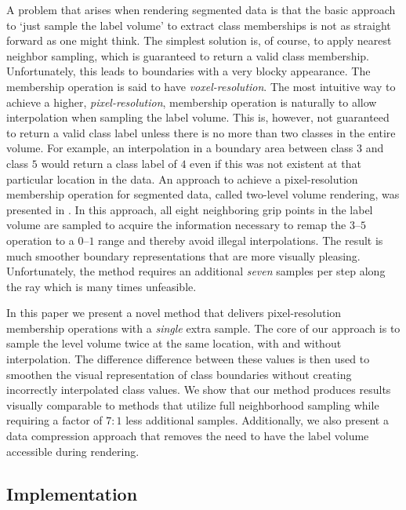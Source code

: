 \documentclass{egpubl}
\begin{document}
A problem that arises when rendering segmented data is that the basic approach to `just sample the label volume' to extract class memberships is not as straight forward as one might think. The simplest solution is, of course, to apply nearest neighbor sampling, which is guaranteed to return a valid class membership. Unfortunately, this leads to boundaries with a very blocky appearance. The membership operation is said to have \emph{voxel-resolution}. The most intuitive way to achieve a higher, \emph{pixel-resolution}, membership operation is naturally to allow interpolation when sampling the label volume. This is, however, not guaranteed to return a valid class label unless there is no more than two classes in the entire volume. For example, an interpolation in a boundary area between class $3$ and class $5$ would return a class label of $4$ even if this was not existent at that particular location in the data. An approach to achieve a pixel-resolution membership operation for segmented data, called two-level volume rendering, was presented in \cite{Hadwiger2003}. In this approach, all eight neighboring grip points in the label volume are sampled to acquire the information necessary to remap the $3$--$5$ operation to a $0$--$1$ range and thereby avoid illegal interpolations. The result is much smoother boundary representations that are more visually pleasing. Unfortunately, the method requires an additional \emph{seven} samples per step along the ray which is many times unfeasible.

In this paper we present a novel method that delivers pixel-resolution membership operations with a \emph{single} extra sample. The core of our approach is to sample the level volume twice at the same location, with and without interpolation. The difference difference between these values is then used to smoothen the visual representation of class boundaries without creating incorrectly interpolated class values. We show that our method produces results visually comparable to methods that utilize full neighborhood sampling while requiring a factor of $7:1$ less additional samples. Additionally, we also present a data compression approach that removes the need to have the label volume accessible during rendering.

\subsection{Implementation}
\end{document}

